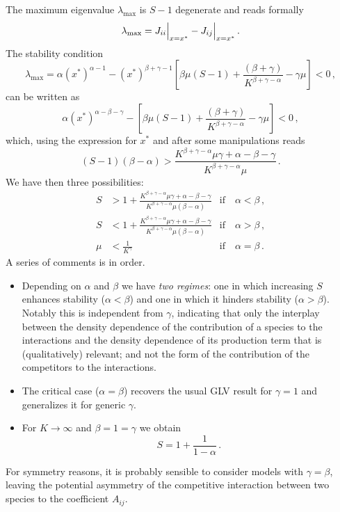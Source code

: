 \documentclass[10pt]{article}
\begin{document}
The maximum eigenvalue $\lambda_{\textrm{max}}$ is $S-1$ degenerate and reads formally
\begin{equation}
    \lambda_{\textrm{max}} = J_{ii}\Big{|}_{x=x^*} - J_{ij}\Big{|}_{x=x^*} \, .
\end{equation}
The stability condition
\begin{equation}
    \lambda_{\textrm{max}} = \alpha (x^*)^{\alpha-1}-(x^*)^{\beta+\gamma-1}\left[\beta \mu(S-1)
    +\frac{(\beta+\gamma)}{K^{\beta+\gamma-\alpha}}-\gamma\mu\right]<0 \, ,
\end{equation}
can be written as
\begin{equation}
    \alpha (x^*)^{\alpha-\beta-\gamma}-\left[\beta \mu(S-1)
    +\frac{(\beta+\gamma)}{K^{\beta+\gamma-\alpha}}-\gamma\mu\right]<0 \, ,
\end{equation}
which, using the expression for $x^*$ and after some manipulations reads
\begin{equation}
    (S-1)(\beta-\alpha) > \frac{K^{\beta+\gamma-\alpha}\mu\gamma+\alpha-\beta-\gamma}{K^{\beta+\gamma-\alpha}\mu} \, .
\end{equation}
We have then three possibilities:
\begin{align}
    S &> 1 + \frac{K^{\beta+\gamma-\alpha}\mu\gamma+\alpha-\beta-\gamma}{K^{\beta+\gamma-\alpha}\mu(\beta-\alpha)} 
    &\textrm{if} \quad \alpha<\beta \, , \\
    S &< 1 + \frac{K^{\beta+\gamma-\alpha}\mu\gamma+\alpha-\beta-\gamma}{K^{\beta+\gamma-\alpha}\mu(\beta-\alpha)} 
    &\textrm{if} \quad \alpha>\beta \, , \\
    \mu &< \frac{1}{K^{\gamma}} &\textrm{if} \quad \alpha=\beta \, .
\end{align}
A series of comments is in order. 
\begin{itemize}
    \item Depending on $\alpha$ and $\beta$ we have \textit{two
    regimes}: one in which increasing $S$ enhances stability ($\alpha<\beta$) and 
    one in which it hinders stability ($\alpha>\beta$).
    Notably this is independent from $\gamma$, indicating that only the interplay between
    the density dependence of the contribution of a species to the interactions and
    the density dependence of its production term that is (qualitatively) relevant; 
    and not the form of the contribution of the competitors to the interactions.
    \item The critical case ($\alpha=\beta$) recovers the usual GLV result
    for $\gamma=1$ and generalizes it for generic $\gamma$.
    \item For $K\to\infty$ and $\beta=1=\gamma$ we obtain
    \begin{equation}
        S=1+\frac{1}{1-\alpha} \, .
    \end{equation}
\end{itemize}
For symmetry reasons, it is probably sensible to consider 
models with $\gamma=\beta$,
leaving the potential asymmetry of the competitive interaction between two species
to the coefficient $A_{ij}$.
\end{document}
